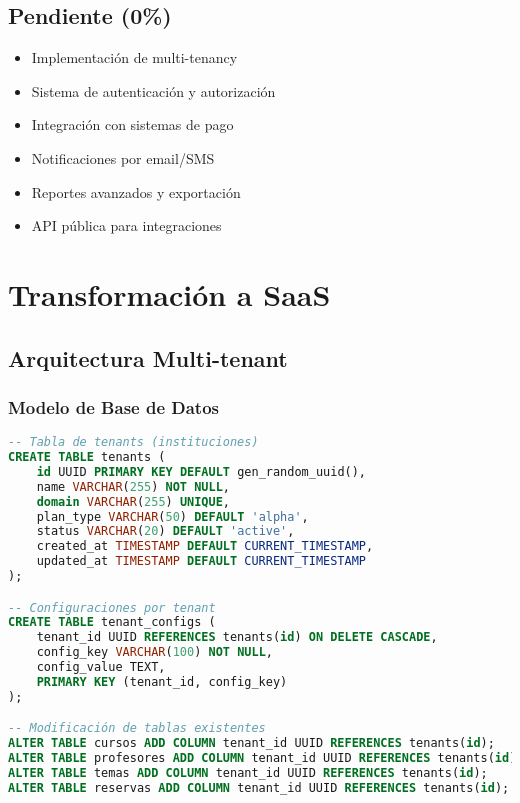 \documentclass[12pt,a4paper]{article}
\begin{document}
\subsection{Pendiente (0\%)}
\begin{itemize}
    \item Implementación de multi-tenancy
    \item Sistema de autenticación y autorización
    \item Integración con sistemas de pago
    \item Notificaciones por email/SMS
    \item Reportes avanzados y exportación
    \item API pública para integraciones
\end{itemize}

\section{Transformación a SaaS}

\subsection{Arquitectura Multi-tenant}

\subsubsection{Modelo de Base de Datos}
\begin{lstlisting}[language=SQL]
-- Tabla de tenants (instituciones)
CREATE TABLE tenants (
    id UUID PRIMARY KEY DEFAULT gen_random_uuid(),
    name VARCHAR(255) NOT NULL,
    domain VARCHAR(255) UNIQUE,
    plan_type VARCHAR(50) DEFAULT 'alpha',
    status VARCHAR(20) DEFAULT 'active',
    created_at TIMESTAMP DEFAULT CURRENT_TIMESTAMP,
    updated_at TIMESTAMP DEFAULT CURRENT_TIMESTAMP
);

-- Configuraciones por tenant
CREATE TABLE tenant_configs (
    tenant_id UUID REFERENCES tenants(id) ON DELETE CASCADE,
    config_key VARCHAR(100) NOT NULL,
    config_value TEXT,
    PRIMARY KEY (tenant_id, config_key)
);

-- Modificación de tablas existentes
ALTER TABLE cursos ADD COLUMN tenant_id UUID REFERENCES tenants(id);
ALTER TABLE profesores ADD COLUMN tenant_id UUID REFERENCES tenants(id);
ALTER TABLE temas ADD COLUMN tenant_id UUID REFERENCES tenants(id);
ALTER TABLE reservas ADD COLUMN tenant_id UUID REFERENCES tenants(id);
\end{lstlisting}
\end{document}
